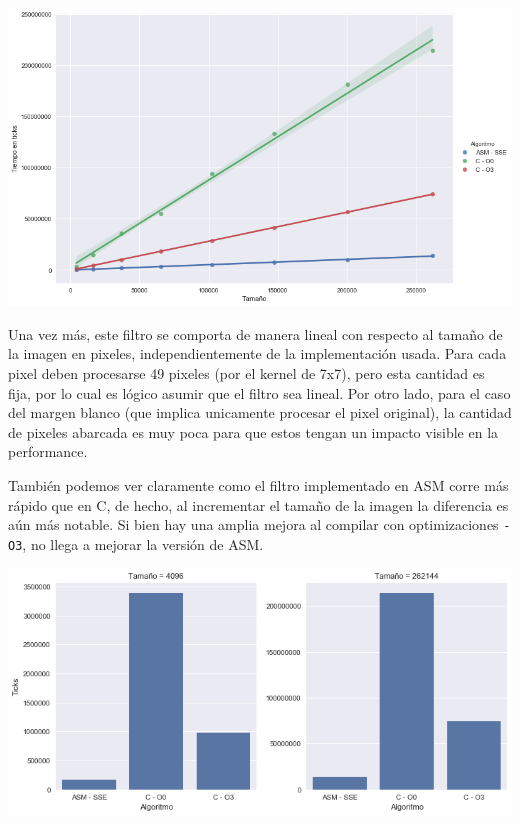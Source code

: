 \begin{center}
	\includegraphics[scale=0.5]{img/maxCloser_CvsASMvsO3.png}
\end{center}

Una vez más, este filtro se comporta de manera lineal con respecto al tamaño de la imagen en pixeles, independientemente de la implementación usada. Para cada pixel deben procesarse 49 pixeles (por el kernel de 7x7), pero esta cantidad es fija, por lo cual es lógico asumir que el filtro sea lineal. Por otro lado, para el caso del margen blanco (que implica unicamente procesar el pixel original), la cantidad de pixeles abarcada es muy poca para que estos tengan un impacto visible en la performance.

También podemos ver claramente como el filtro implementado en ASM corre más rápido que en C, de hecho, al incrementar el tamaño de la imagen la diferencia es aún más notable. Si bien hay una amplia mejora al compilar con optimizaciones \texttt{-O3}, no llega a mejorar la versión de ASM.

\begin{center}
	\includegraphics[scale=0.5]{img/maxCloser_CvsASMvsO3_bars.png}
\end{center}


